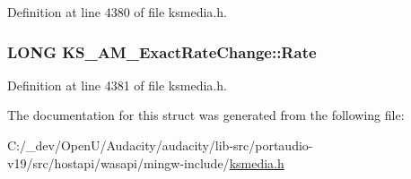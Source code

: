 Definition at line 4380 of file ksmedia.\+h.

\subsubsection[{\texorpdfstring{Rate}{Rate}}]{\setlength{\rightskip}{0pt plus 5cm}L\+O\+NG K\+S\+\_\+\+A\+M\+\_\+\+Exact\+Rate\+Change\+::\+Rate}\hypertarget{struct_k_s___a_m___exact_rate_change_a01206cd8be9be90b1ad030c8b462e45a}{}\label{struct_k_s___a_m___exact_rate_change_a01206cd8be9be90b1ad030c8b462e45a}


Definition at line 4381 of file ksmedia.\+h.



The documentation for this struct was generated from the following file\+:\begin{DoxyCompactItemize}
\item 
C\+:/\+\_\+dev/\+Open\+U/\+Audacity/audacity/lib-\/src/portaudio-\/v19/src/hostapi/wasapi/mingw-\/include/\hyperlink{ksmedia_8h}{ksmedia.\+h}\end{DoxyCompactItemize}
